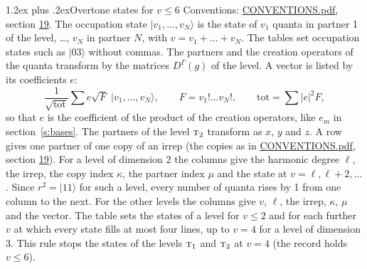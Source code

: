 \documentclass[10pt,a4paper]{article}
\makeatletter
\renewcommand\section{\@startsection{section}{1}{\z@}{-3ex plus -1ex minus -.2ex}%
  {1.2ex plus .2ex}{\normalfont\large\sffamily\bfseries\color{parttitle}}}
\numberwithin{equation}{section}
\newcommand{\irr}[1]{\text{\normalfont\scshape #1}}
\newcommand{\repD}[1]{D^{#1}}
\newcommand{\mult}{\kappa}
\newcommand{\intx}{\mu}
\newcommand{\occ}[1]{\lvert #1\rangle}
\makeatother
\begin{document}
\section{Overtone states for \texorpdfstring{$v \le 6$}{v \textleq\ 6}}\label{s:overtone_states}
Conventions: \href{../../CONVENTIONS.pdf}{CONVENTIONS.pdf}, section \href{../../CONVENTIONS.pdf\#conv.19}{19}.
\leavevmode\label{n:vector.occupation}\label{n:local.quanta.partner}\label{n:local.weight.occupation}The occupation state $\occ{v_1, \dots, v_N}$ is the state of $v_1$ quanta in partner 1 of the level, \dots, $v_N$ in partner $N$, with $v = v_1 + \dots + v_N$. The tables set occupation states such as $\occ{03}$ without commas. The partners and the creation operators of the quanta transform by the matrices $\repD{\Gamma}(g)$ of the level. A vector is listed by its coefficients $e$:
\begin{equation}\label{e:occupation}\frac{1}{\sqrt{\mathrm{tot}}}\sum e\sqrt{F}\;\occ{v_1, \dots, v_N},\qquad F = v_1!\dots v_N!,\qquad \mathrm{tot} = \sum |e|^2F,\end{equation}
so that $e$ is the coefficient of the product of the creation operators, like $e_m$ in section~\ref{s:bases}. The partners of the level $\irr{t}_{2}$ transform as $x$, $y$ and $z$. A row gives one partner of one copy of an irrep (the copies as in \href{../../CONVENTIONS.pdf}{CONVENTIONS.pdf}, section \href{../../CONVENTIONS.pdf\#conv.19}{19}). For a level of dimension 2 the columns give the harmonic degree $\ell$, the irrep, the copy index $\mult$, the partner index $\intx$ and the state at $v = \ell, \ell + 2, \dots$. Since $r^2 = \occ{11}$ for such a level, every number of quanta rises by 1 from one column to the next. For the other levels the columns give $v$, $\ell$, the irrep, $\mult$, $\intx$ and the vector.
The table sets the states of a level for $v \le 2$ and for each further $v$ at which every state fills at most four lines, up to $v = 4$ for a level of dimension 3. This rule stops the states of the levels $\irr{t}_{1}$ and $\irr{t}_{2}$ at $v = 4$ (the record holds $v \le 6$).
\end{document}

